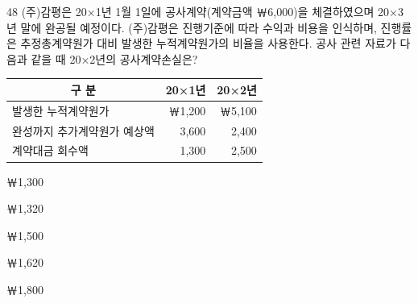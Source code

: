 \begin{question}{48}
(주)감평은 20×1년 1월 1일에 공사계약(계약금액 ￦6,000)을 체결하였으며 20×3년 말에 완공될 예정이다. (주)감평은 진행기준에 따라 수익과 비용을 인식하며, 진행률은 추정총계약원가 대비 발생한 누적계약원가의 비율을 사용한다. 공사 관련 자료가 다음과 같을 때 20×2년의 공사계약손실은?

{\small\centering
\begin{tabular}{|l|r|r|}\hline
\multicolumn{1}{|c|}{구 분} & \multicolumn{1}{c|}{20×1년} & \multicolumn{1}{c|}{20×2년} \\ \hline
발생한 누적계약원가 & ￦1,200 & ￦5,100 \\ \hline
완성까지 추가계약원가 예상액 & 3,600 & 2,400 \\ \hline
계약대금 회수액 & 1,300 & 2,500 \\ \hline
\end{tabular}\par}
\begin{choices}
  \item ￦1,300
  \item ￦1,320
  \item ￦1,500
  \item ￦1,620
  \item ￦1,800
\end{choices}
\end{question}

